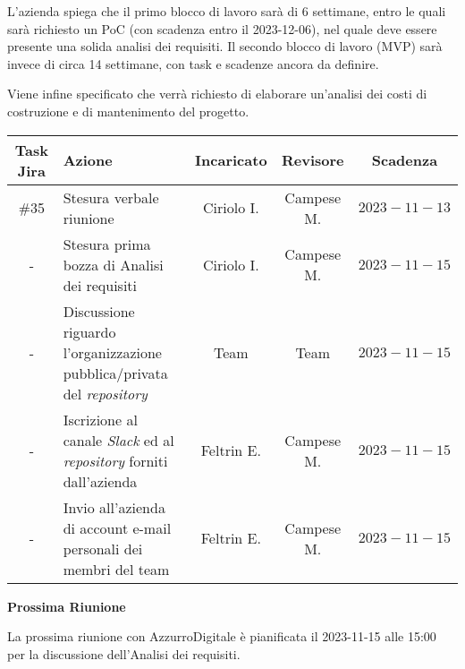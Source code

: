 \documentclass[10pt, a4paper]{article}
\begin{document}
\begin{paracol}{2}
L'azienda spiega che il primo blocco di lavoro sarà di 6 settimane, entro le quali sarà richiesto un PoC (con scadenza entro il 2023-12-06), nel quale deve essere presente una solida analisi dei requisiti. Il secondo blocco di lavoro (MVP) sarà invece di circa 14 settimane, con task e scadenze ancora da definire.

Viene infine specificato che verrà richiesto di elaborare un'analisi dei costi di costruzione e di mantenimento del progetto.

\vspace{12.5em}

\decisioni

\end{paracol}

\newpage


{\renewcommand{\arraystretch}{1.5}
\begin{tabularx}{\textwidth}{c|X|c|c|c}
\textbf{Task Jira} & \textbf{Azione} & \textbf{Incaricato} & \textbf{Revisore} & \textbf{Scadenza} \\
\hline
\#35 &
Stesura verbale riunione &
Ciriolo I. &
Campese M. &
$2023-11-13$ \\
\hline
- &
Stesura prima bozza di Analisi dei requisiti &
Ciriolo I. &
Campese M. &
$2023-11-15$ \\
\hline
- &
Discussione riguardo l'organizzazione pubblica/privata del \textit{repository} &
Team &
Team &
$2023-11-15$ \\
\hline
- &
Iscrizione al canale \textit{Slack} ed al \textit{repository} forniti dall'azienda &
Feltrin E. &
Campese M. &
$2023-11-15$ \\
\hline
- &
Invio all'azienda di account e-mail personali dei membri del team &
Feltrin E. &
Campese M. &
$2023-11-15$ \\
\end{tabularx}}

\vspace{3em}


\textbf{Prossima Riunione}

La prossima riunione con AzzurroDigitale è pianificata il 2023-11-15 alle 15:00 per la discussione dell'Analisi dei requisiti.
\end{document}

